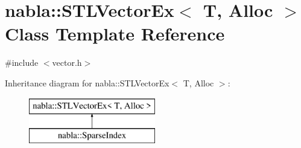 \hypertarget{classnabla_1_1_s_t_l_vector_ex}{}\section{nabla\+::S\+T\+L\+Vector\+Ex$<$ T, Alloc $>$ Class Template Reference}
\label{classnabla_1_1_s_t_l_vector_ex}


{\ttfamily \#include $<$vector.\+h$>$}

Inheritance diagram for nabla\+::S\+T\+L\+Vector\+Ex$<$ T, Alloc $>$\+:\begin{figure}[H]
\begin{center}
\leavevmode
\includegraphics[height=2.000000cm]{classnabla_1_1_s_t_l_vector_ex}
\end{center}
\end{figure}
